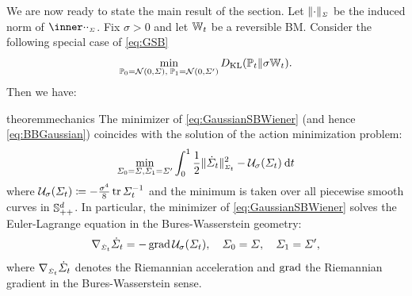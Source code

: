 We are now ready to state the main result of the section. Let $\normBW[\cdot][\Sigma]$ be the induced norm of $\innerBW[\cdot][\cdot][\Sigma]$. Fix $\sigma >0$ and let $\mathbb{W}_{t}$ be a {reversible} \acrlong{BM}. Consider the following special case of \eqref{eq:GSB} %
\begin{equation}
\label{eq:GaussianSBWiener}
\min_{ \mathbb{P}_{{0}} = \mathcal{N}(0, \Sigma),\; \mathbb{P}_{{1}} = \mathcal{N}(0, \Sigma') } D_{\mathrm{KL}}(\mathbb{P}_{{t}} \| \sigma\mathbb{W}_{t}).
\end{equation}
Then we have:
\begin{restatable}{theorem}{mechanics}
\label{thm:mechanics}
The minimizer of \eqref{eq:GaussianSBWiener} (and hence \eqref{eq:BBGaussian}) coincides with the solution of the action minimization problem:
\begin{align}
\label{eq:LagBW}
\min_{\Sigcurve[0] = \Sigma, \Sigma_\horizon = \Sigma'} \int_{0}^\horizon \LagBW \dt
\end{align}
where $\penergyBW \defeq - \frac{\sigma^4}{8} \tr \Sigcurveinv$ and the minimum is taken over all piecewise smooth curves in $\mathbb{S}_{++}^d$. In particular, the minimizer of \eqref{eq:GaussianSBWiener} solves the Euler-Lagrange equation in the Bures-Wasserstein geometry:
\begin{equation}
\label{eq:el-bw}
\nabla_{\ssstyle\dSigcurve}\dSigcurve = -  \gradBW \penergyBW, \quad \Sigcurve[0] = \Sigma,\quad \Sigcurve[\horizon] = \Sigma',
\end{equation}
where $\nabla_{\scriptscriptstyle\dot{\Sigma}_{t}}\dot{\Sigma}_{t}$ denotes the Riemannian acceleration and $\operatorname{\mathrm{grad}}$ the Riemannian gradient in the Bures-Wasserstein sense.
\end{restatable}

